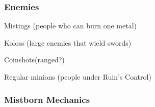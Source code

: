 \documentclass{article}
\begin{document}
\subsubsection{Enemies}
\begin{description}
\item Mistings (people who can burn one metal)
\item Koloss (large enemies that wield swords)
\item Coinshots(ranged?)
\item Regular minions (people under Ruin’s Control)
\end{description}

\subsubsection{Mistborn Mechanics}
\end{document}
